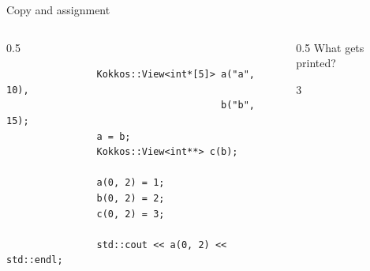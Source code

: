 \documentclass[
    aspectratio=169,
    \createHandout
]{beamer}
\begin{document}

\begin{frame}[fragile]{Copy and assignment}
    \begin{columns}
        \begin{column}{0.5\linewidth}
            \begin{verbatim}
                Kokkos::View<int*[5]> a("a", 10),
                                      b("b", 15);
                a = b;
                Kokkos::View<int**> c(b);

                a(0, 2) = 1;
                b(0, 2) = 2;
                c(0, 2) = 3;

                std::cout << a(0, 2) << std::endl;
            \end{verbatim}
        \end{column}
        \begin{column}{0.5\linewidth}
             What gets printed?

            \pause

             3
        \end{column}
    \end{columns}
\end{frame}

\end{document}
